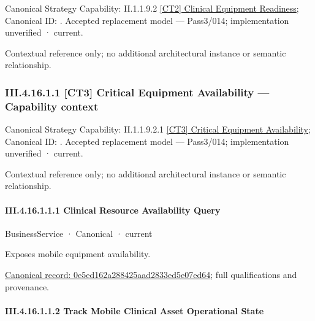{\small Canonical Strategy Capability: II.1.1.9.2 \hyperref[element:e53263d0800243fe9ced7822116646f8]{[CT2] Clinical Equipment Readiness}; Canonical ID: \texttt{}. Accepted replacement model — Pass3/014; implementation unverified · current.}\par
Contextual reference only; no additional architectural instance or semantic relationship.\par
\subsubsection*{III.4.16.1.1 [CT3] Critical Equipment Availability — Capability context}
\label{navigation:III.4.16.1.1}

{\small Canonical Strategy Capability: II.1.1.9.2.1 \hyperref[element:e2b1a1341f7d4c5ba7884934bd126fc0]{[CT3] Critical Equipment Availability}; Canonical ID: \texttt{}. Accepted replacement model — Pass3/014; implementation unverified · current.}\par
Contextual reference only; no additional architectural instance or semantic relationship.\par
\paragraph*{III.4.16.1.1.1 Clinical Resource Availability Query}
\label{navigation:III.4.16.1.1.1}

\label{element:0e5ed162a288425aad2833ed5e07ed64}
{\small BusinessService · Canonical · current}\par

Exposes mobile equipment availability.


{\footnotesize \href{../../../../../../../../continuum/business/business-service/0e5ed162a288425aad2833ed5e07ed64.md}{Canonical record: 0e5ed162a288425aad2833ed5e07ed64}; full qualifications and provenance.}\par
\paragraph*{III.4.16.1.1.2 Track Mobile Clinical Asset Operational State}
\label{navigation:III.4.16.1.1.2}

